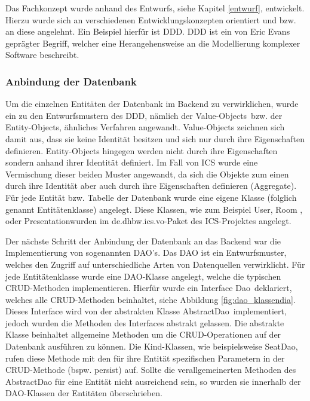 Das Fachkonzept wurde anhand des Entwurfs, siehe Kapitel \ref{entwurf}, entwickelt. Hierzu wurde sich an verschiedenen Entwicklungskonzepten orientiert und bzw. an diese angelehnt. Ein Beispiel hierfür ist \ac{DDD}. \ac{DDD} ist ein von Eric Evans geprägter Begriff, welcher eine Herangehensweise an die Modellierung komplexer Software beschreibt. \autocite{WikimediaFoundationInc.2019a}

\subsubsection{Anbindung der Datenbank}

Um die einzelnen Entitäten der Datenbank im Backend zu verwirklichen, wurde ein zu den Entwurfsmustern des \ac{DDD}, nämlich der \glqq Value-Objects\grqq \, bzw. der Entity-Objects, ähnliches Verfahren angewandt. Value-Objects zeichnen sich damit aus, dass sie keine Identität besitzen und sich nur durch ihre Eigenschaften definieren. Entity-Objects hingegen werden nicht durch ihre Eigenschaften sondern anhand ihrer Identität definiert. \autocite{WikimediaFoundationInc.2019a} Im Fall von \ac{ICS} wurde eine Vermischung dieser beiden Muster angewandt, da sich die Objekte zum einen durch ihre Identität aber auch durch ihre Eigenschaften definieren (Aggregate). Für jede Entität bzw. Tabelle der Datenbank wurde eine eigene Klasse (folglich genannt Entitätenklasse) angelegt. Diese Klassen, wie zum Beispiel \glqq User\grqq , \glqq Room \grqq , oder \glqq Presentation\grqq wurden im \glqq de.dhbw.ics.vo\grqq-Paket des \ac{ICS}-Projektes angelegt.

Der nächste Schritt der Anbindung der Datenbank an das Backend war die Implementierung von sogenannten \ac{DAO}'s. Das \ac{DAO} ist ein Entwurfsmuster, welches den Zugriff auf unterschiedliche Arten von Datenquellen verwirklicht. \autocite{WikimediaFoundationInc.2019b} Für jede Entitätenklasse wurde eine \ac{DAO}-Klasse angelegt, welche die typischen \ac{CRUD}-Methoden implementieren. Hierfür wurde ein Interface \glqq Dao\grqq \, deklariert, welches alle \ac{CRUD}-Methoden beinhaltet, siehe Abbildung \ref{fig:dao_klassendia}. Dieses Interface wird von der abstrakten Klasse \glqq AbstractDao\grqq \, implementiert, jedoch wurden die Methoden des Interfaces abstrakt gelassen. Die abstrakte Klasse beinhaltet allgemeine Methoden um die \ac{CRUD}-Operationen auf der Datenbank ausführen zu können. Die Kind-Klassen, wie beispielsweise \glqq SeatDao\grqq, rufen diese Methode mit den für ihre Entität spezifischen Parametern in der \ac{CRUD}-Methode (bspw. \glqq persist\grqq) auf. Sollte die verallgemeinerten Methoden des AbstractDao für eine Entität nicht ausreichend sein, so wurden sie innerhalb der DAO-Klassen der Entitäten überschrieben.

